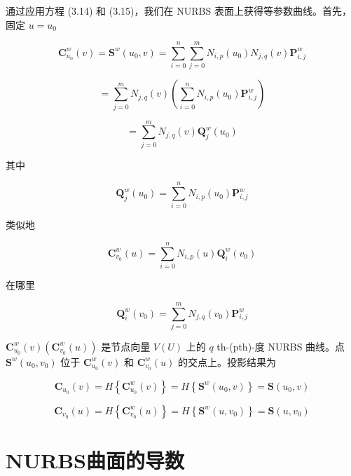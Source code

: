 \documentclass[../main.tex]{subfiles}
\begin{document}
通过应用方程 (3.14) 和 (3.15)，我们在 NURBS 表面上获得等参数曲线。首先，固定 \(u = {u}_{0}\)

\[
{\mathbf{C}}_{{u}_{0}}^{w}\left( v\right)  = {\mathbf{S}}^{w}\left( {{u}_{0},v}\right)  = \mathop{\sum }\limits_{{i = 0}}^{n}\mathop{\sum }\limits_{{j = 0}}^{m}{N}_{i,p}\left( {u}_{0}\right) {N}_{j,q}\left( v\right) {\mathbf{P}}_{i,j}^{w} \tag{4.16}
\]

\[
= \mathop{\sum }\limits_{{j = 0}}^{m}{N}_{j,q}\left( v\right) \left( {\mathop{\sum }\limits_{{i = 0}}^{n}{N}_{i,p}\left( {u}_{0}\right) {\mathbf{P}}_{i,j}^{w}}\right)
\]

\[
= \mathop{\sum }\limits_{{j = 0}}^{m}{N}_{j,q}\left( v\right) {\mathbf{Q}}_{j}^{w}\left( {u}_{0}\right)
\]

其中

\[
{\mathbf{Q}}_{j}^{w}\left( {u}_{0}\right)  = \mathop{\sum }\limits_{{i = 0}}^{n}{N}_{i,p}\left( {u}_{0}\right) {\mathbf{P}}_{i,j}^{w}
\]

类似地

\[
{\mathbf{C}}_{{v}_{0}}^{w}\left( u\right)  = \mathop{\sum }\limits_{{i = 0}}^{n}{N}_{i,p}\left( u\right) {\mathbf{Q}}_{i}^{w}\left( {v}_{0}\right)  \tag{4.17}
\]

在哪里

\[
{\mathbf{Q}}_{i}^{w}\left( {v}_{0}\right)  = \mathop{\sum }\limits_{{j = 0}}^{m}{N}_{j,q}\left( {v}_{0}\right) {\mathbf{P}}_{i,j}^{w}
\]

\({\mathbf{C}}_{{u}_{0}}^{w}\left( v\right) \left( {{\mathbf{C}}_{{v}_{0}}^{w}\left( u\right) }\right)\) 是节点向量 \(V\left( U\right)\) 上的 \(q\) th-(pth)-度 NURBS 曲线。点 \({\mathbf{S}}^{w}\left( {{u}_{0},{v}_{0}}\right)\) 位于 \({\mathbf{C}}_{{u}_{0}}^{w}\left( v\right)\) 和 \({\mathbf{C}}_{{v}_{0}}^{w}\left( u\right)\) 的交点上。投影结果为

\[
{\mathbf{C}}_{{u}_{0}}\left( v\right)  = H\left\{  {{\mathbf{C}}_{{u}_{0}}^{w}\left( v\right) }\right\}   = H\left\{  {{\mathbf{S}}^{w}\left( {{u}_{0},v}\right) }\right\}   = \mathbf{S}\left( {{u}_{0},v}\right)
\]

\[
{\mathbf{C}}_{{v}_{0}}\left( u\right)  = H\left\{  {{\mathbf{C}}_{{v}_{0}}^{w}\left( u\right) }\right\}   = H\left\{  {{\mathbf{S}}^{w}\left( {u,{v}_{0}}\right) }\right\}   = \mathbf{S}\left( {u,{v}_{0}}\right)  \tag{4.18}
\]



\section{NURBS曲面的导数}
\end{document}
